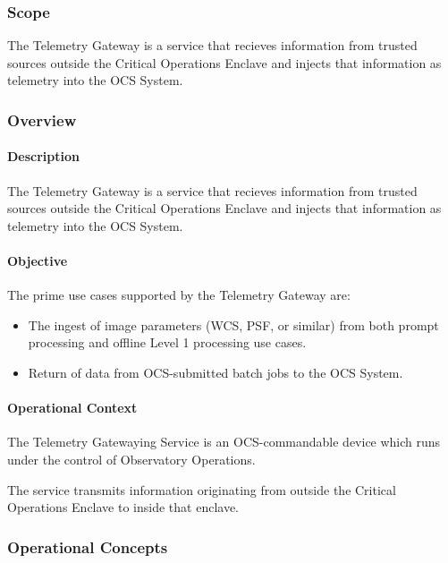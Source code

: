﻿\subsubsection{Scope}

The Telemetry Gateway is a service that recieves information from
trusted sources outside the Critical Operations Enclave and injects
that information as telemetry into the OCS System.

\subsubsection{Overview}

\paragraph{Description}

The Telemetry Gateway is a service that recieves information from
trusted sources outside the Critical Operations Enclave and injects
that information as telemetry into the OCS System. 

\paragraph{Objective}

The prime use cases supported by the Telemetry Gateway are:

\begin{itemize}
\item The ingest of image parameters (WCS, PSF, or similar) from both prompt
processing and offline Level 1 processing use cases.
\item Return of data from OCS-submitted batch jobs to the OCS System.
\end{itemize}

\paragraph{Operational Context}

The Telemetry Gatewaying Service is an OCS-commandable device which runs
under the control of Observatory Operations.

The service transmits information originating from outside the Critical Operations 
Enclave to inside that enclave.

\subsubsection{Operational Concepts}


